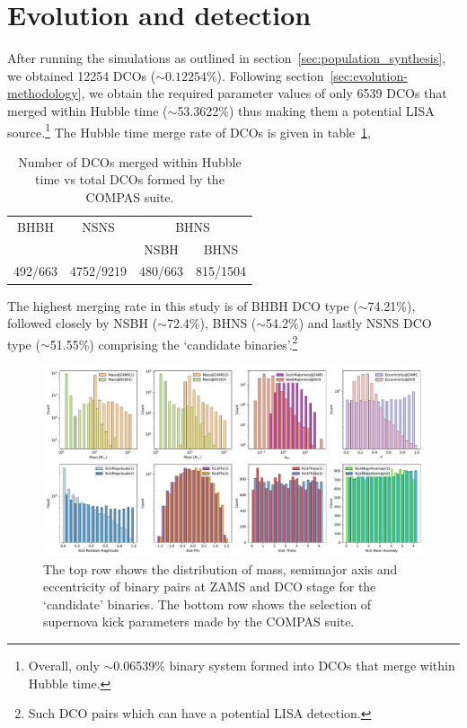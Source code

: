 \documentclass[journal, twocolumn]{IEEEtran}
\begin{document}
	\section{Evolution and detection}
	\label{sec:evolution-and-detection}
	    
    After running the simulations as outlined in section~\ref{sec:population_synthesis}, we obtained 12254 DCOs ($\sim0.12254\%$).
    Following section~\ref{sec:evolution-methodology}, we obtain the required parameter values of only 6539 DCOs that merged within Hubble time ($\sim$53.3622\%) thus making them a potential LISA source.\footnote{Overall, only $\sim$0.06539\% binary system formed into DCOs that merge within Hubble time.}
    The Hubble time merge rate of DCOs is given in table~\ref{tab:dco_details},

    \begin{table}[!ht]
        \centering
        \begin{tabular}{@{}cccc@{}}
        	\toprule
            \multirow{2.5}{*}{BHBH} & \multirow{2.5}{*}{NSNS} & \multicolumn{2}{c}{BHNS} \\ \cmidrule(l){3-4}
            &           & NSBH    & BHNS     \\ \midrule
            492/663 & 4752/9219 & 480/663 & 815/1504 \\ \bottomrule
        \end{tabular}%
        \caption{Number of DCOs merged within Hubble time vs total DCOs formed by the COMPAS suite.}
        \label{tab:dco_details}
    \end{table}

    The highest merging rate in this study is of BHBH DCO type ($\sim$74.21\%), followed closely by NSBH ($\sim$72.4\%), BHNS ($\sim$54.2\%) and lastly NSNS DCO type ($\sim$51.55\%) comprising the `candidate binaries'.\footnote{Such DCO pairs which can have a potential LISA detection.}
    
	\begin{figure}[!h]%
		\centering
	    \includegraphics[width=\textwidth]{analysis_data/main_analysis_folder/all_zams_params}
		\caption{The top row shows the distribution of mass, semimajor axis and eccentricity of binary pairs at ZAMS and DCO stage for the `candidate' binaries. The bottom row shows the selection of supernova kick parameters made by the COMPAS suite.}
		\label{fig:all_zams_params}
	\end{figure}%
    
\end{document}
